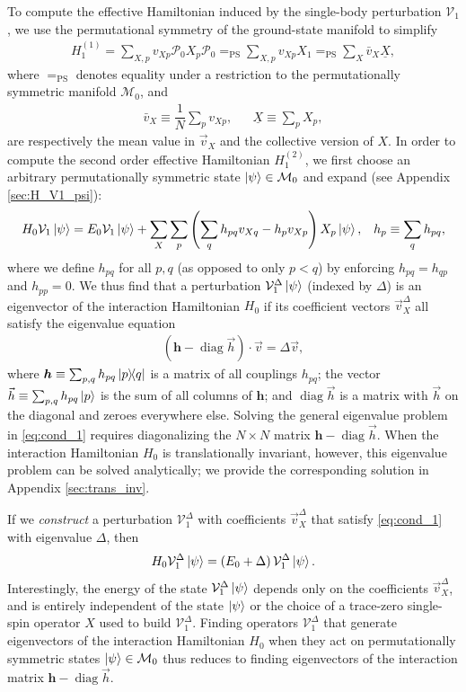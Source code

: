 \documentclass[nofootinbib,notitlepage,11pt]{revtex4-2}
\newcommand{\f}[2]{\dfrac{#1}{#2}} %
\newcommand{\p}[1]{\left(#1\right)} %
\renewcommand{\c}{\cdot} %
\newcommand{\m}{\bm} %
\renewcommand{\v}{\vec} %
\newcommand{\1}{\mathds{1}}
\newcommand{\M}{\mathcal{M}}
\renewcommand{\P}{\mathcal{P}}
\newcommand{\V}{\mathcal{V}}
\newcommand{\EQPS}{=_{\text{PS}}}
\newcommand{\col}{\underline}
\DeclareMathOperator{\diag}{diag}
\begin{document}
To compute the effective Hamiltonian induced by the single-body
perturbation $\V_1$, we use the permutational symmetry of the
ground-state manifold to simplify
\begin{align}
  H_1^{(1)} = \sum_{X,p} v_{Xp} \P_0 X_p \P_0
  \EQPS \sum_{X,p} v_{Xp} X_1
  \EQPS \sum_X \bar v_X \col{X},
  \label{eq:H_1_1}
\end{align}
where $\EQPS$ denotes equality under a restriction to the
permutationally symmetric manifold $\M_0$, and
\begin{align}
  \bar v_X \equiv \f1N \sum_p v_{Xp},
  &&
  \col{X} \equiv \sum_p X_p,
\end{align}
are respectively the mean value in $\v v_X$ and the collective version
of $X$.  In order to compute the second order effective Hamiltonian
$H_1^{(2)}$, we first choose an arbitrary permutationally symmetric
state $\ket\psi\in\M_0$ and expand (see Appendix \ref{sec:H_V1_psi}):
\begin{align}
  H_0 \V_1 \ket\psi
  = E_0 \V_1 \ket\psi
  + \sum_X \sum_p \p{\sum_q h_{pq} v_{Xq} - h_p v_{Xp}} X_p
  \ket\psi,
  &&
  h_p \equiv \sum_q h_{pq},
  \label{eq:H_V1_psi}
\end{align}
where we define $h_{pq}$ for all $p,q$ (as opposed to only $p<q$) by
enforcing $h_{pq}=h_{qp}$ and $h_{pp}=0$.  We thus find that a
perturbation $\V_1^\Delta\ket\psi$ (indexed by $\Delta$) is an
eigenvector of the interaction Hamiltonian $H_0$ if its coefficient
vectors $\v v_X^\Delta$ all satisfy the eigenvalue equation
\begin{align}
  \p{\m h - \diag\v h}\c\v v = \Delta \v v,
  \label{eq:cond_1}
\end{align}
where $\m h\equiv\sum_{p,q}h_{pq}\op{p}{q}$ is a matrix of all
couplings $h_{pq}$; the vector $\v h\equiv\sum_{p,q}h_{pq}\ket{p}$ is
the sum of all columns of $\m h$; and $\diag\v h$ is a matrix with
$\v h$ on the diagonal and zeroes everywhere else.  Solving the
general eigenvalue problem in \eqref{eq:cond_1} requires diagonalizing
the $N\times N$ matrix $\m h-\diag\v h$.  When the interaction
Hamiltonian $H_0$ is translationally invariant, however, this
eigenvalue problem can be solved analytically; we provide the
corresponding solution in Appendix \ref{sec:trans_inv}.

If we {\it construct} a perturbation $\V_1^\Delta$ with coefficients
$\v v_X^\Delta$ that satisfy \eqref{eq:cond_1} with eigenvalue
$\Delta$, then
\begin{align}
  H_0 \V_1^\Delta \ket\psi = \p{E_0 + \Delta} \V_1^\Delta \ket\psi.
\end{align}
Interestingly, the energy of the state $\V_1^\Delta\ket\psi$ depends
only on the coefficients $\v v_X^\Delta$, and is entirely independent
of the state $\ket\psi$ or the choice of a trace-zero single-spin
operator $X$ used to build $\V_1^\Delta$.  Finding operators
$\V_1^\Delta$ that generate eigenvectors of the interaction
Hamiltonian $H_0$ when they act on permutationally symmetric states
$\ket\psi\in\M_0$ thus reduces to finding eigenvectors of the
interaction matrix $\m h-\diag\v h$.
\end{document}
